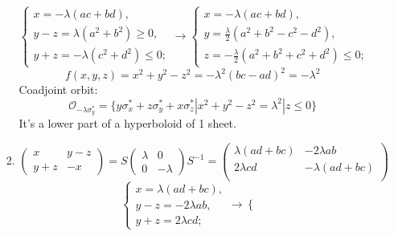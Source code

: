 \documentclass[12pt]{article}
\theoremstyle{definition}
\begin{document}
\begin{enumerate}
\begin{itemize}
\begin{enumerate}
        \begin{equation}
            \begin{cases}
                x=-\lambda(ac+bd),\\
                y-z=\lambda(a^2+b^2)\geq0,\\
                y+z=-\lambda(c^2+d^2)\leq0;
            \end{cases}\rightarrow\begin{cases}
                x=-\lambda(ac+bd),\\
                y=\frac{\lambda}{2}(a^2+b^2-c^2-d^2),\\
                z=-\frac{\lambda}{2}(a^2+b^2+c^2+d^2)\leq0;
            \end{cases}
        \end{equation}
        \begin{equation}
            f(x,y,z)=x^2+y^2-z^2=-\lambda^2(bc-ad)^2=-\lambda^2
        \end{equation}
        Coadjoint orbit:
        \begin{equation}
            \mathcal{O}_{-\lambda\sigma^*_y}=\{y\sigma^*_x+z\sigma^*_y+x\sigma^*_z|x^2+y^2-z^2=\lambda^2|z\leq0\}
        \end{equation}
        It's a lower part of a hyperboloid of 1 sheet.
        \item \begin{equation}
            \begin{pmatrix}
            x & y-z \\
            y+z & -x
        \end{pmatrix}=
        S \begin{pmatrix}
            \lambda & 0 \\
            0 & -\lambda
        \end{pmatrix}  S^{-1}= 
        \begin{pmatrix}
            \lambda(ad+bc) & -2\lambda ab \\
            2\lambda cd & -\lambda(ad+bc) \\
    \end{pmatrix}
    \end{equation}
    \begin{equation}
        \begin{cases}
            x=\lambda(ad+bc),\\
            y-z=-2\lambda ab,\\
            y+z=2\lambda cd;
        \end{cases}\rightarrow\begin{cases}

\end{cases}
\end{equation}
\end{enumerate}
\end{itemize}
\end{enumerate}
\end{document}
